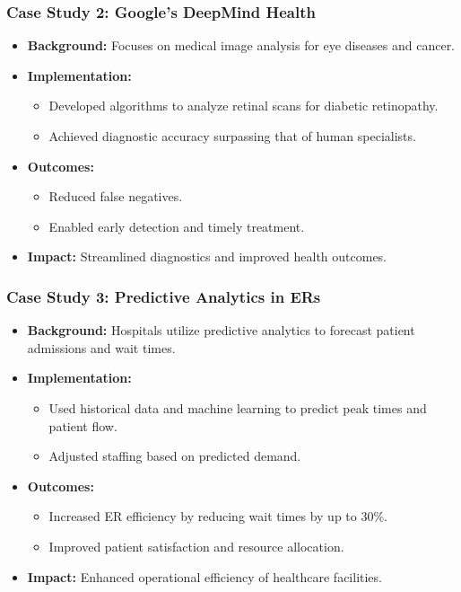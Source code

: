 \documentclass[aspectratio=169]{beamer}
\begin{document}
\begin{frame}[fragile]
    \frametitle{Case Study 2: Google's DeepMind Health}
    \begin{itemize}
        \item \textbf{Background:} Focuses on medical image analysis for eye diseases and cancer.
        \item \textbf{Implementation:}
            \begin{itemize}
                \item Developed algorithms to analyze retinal scans for diabetic retinopathy.
                \item Achieved diagnostic accuracy surpassing that of human specialists.
            \end{itemize}
        \item \textbf{Outcomes:}
            \begin{itemize}
                \item Reduced false negatives.
                \item Enabled early detection and timely treatment.
            \end{itemize}
        \item \textbf{Impact:} Streamlined diagnostics and improved health outcomes.
    \end{itemize}
\end{frame}

\begin{frame}[fragile]
    \frametitle{Case Study 3: Predictive Analytics in ERs}
    \begin{itemize}
        \item \textbf{Background:} Hospitals utilize predictive analytics to forecast patient admissions and wait times.
        \item \textbf{Implementation:}
            \begin{itemize}
                \item Used historical data and machine learning to predict peak times and patient flow.
                \item Adjusted staffing based on predicted demand.
            \end{itemize}
        \item \textbf{Outcomes:}
            \begin{itemize}
                \item Increased ER efficiency by reducing wait times by up to 30\%.
                \item Improved patient satisfaction and resource allocation.
            \end{itemize}
        \item \textbf{Impact:} Enhanced operational efficiency of healthcare facilities.
    \end{itemize}
\end{frame}
\end{document}
